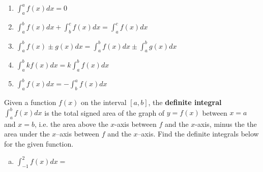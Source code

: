 \documentclass[answers]{exam}
\begin{document}
\begin{questions}
\begin{enumerate}[(1)]
			\item $\displaystyle \int_a^a f(x) dx = 0$\\
			
			\item $\displaystyle \int_a^b f(x) dx + \int_b^c f(x) dx = \int_a^c f(x) dx$\\
			
			\item $\displaystyle \int_a^b f(x)\pm g(x)  dx = \int_a^b f(x) dx \pm \int_a^b g(x) dx$\\
			
			\item $\displaystyle \int_a^b kf(x) dx = k \int_a^b f(x) dx$\\
			
			\item $\displaystyle \int_a^b f(x) dx = - \int_b^a f(x) dx$\\
		\end{enumerate}
		
		
		\question Given a function $f(x)$ on the interval $[a, b]$, the \textbf{definite integral} $\displaystyle \int_a^b f(x) dx$ is the total signed area of the graph of $y = f(x)$ between $x = a$ and $x = b$, i.e. the area above the $x$-axis between $f$ and the $x$-axis, minus the the area under the $x$--axis between $f$ and the $x$--axis. Find the definite integrals below for the given function.
		
		\begin{center}
			
			
		\end{center}
		
		\begin{enumerate}[(a)]
			
			
			\item $\displaystyle \int_{-1}^{2} f(x) dx = $\\
			

\end{enumerate}
\end{questions}
\end{document}
